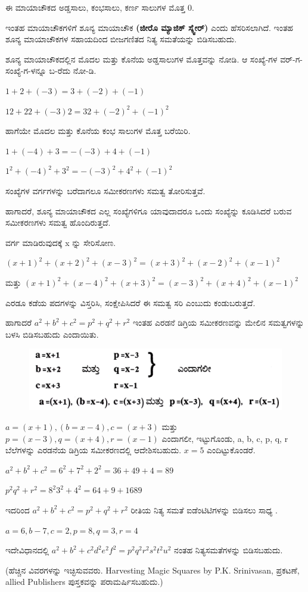 ಈ ಮಾಯಾಚೌಕದ ಅಡ್ಡಸಾಲು, ಕಂಭಸಾಲು, ಕರ್ಣ ಸಾಲುಗಳ ಮೊತ್ತ 0.

ಇಂತಹ ಮಾಯಾಚೌಕಗಳಿಗೆ ಶೂನ್ಯ ಮಾಯಾಚೌಕ \textbf{(ಜೀರೊ ಮ್ಯಾಜಿಕ್ ಸ್ಕ್ವೇರ್)} ಎಂದು ಹೆಸರಿಸಲಾಗಿದೆ. ಇಂತಹ ಶೂನ್ಯ ಮಾಯಾಚೌಕಗಳ ಸಹಾಯದಿಂದ ಬೀಜಗಣಿತದ ನಿತ್ಯ ಸಮತೆಯನ್ನು ಬಿಡಿಸಬಹುದು.

ಶೂನ್ಯ ಮಾಯಾಚೌಕದಲ್ಲಿನ ಮೊದಲ ಮತ್ತು ಕೊನೆಯ ಅಡ್ಡಸಾಲುಗಳ ಮೊತ್ತವನ್ನು ನೋಡಿ. ಆ ಸಂಖ್ಯೆ-ಗಳ ವರ್-ಗ-ಸಂಖ್ಯೆ-ಗ-ಳನ್ನೂ ಬ-ರೆದು ನೋ-ಡಿ.

$1+2+(-3) =3+(-2)+(-1)$

$12+22+(-3) 2 =32+(-2)^2 +(-1)^2$

ಹಾಗೆಯೇ ಮೊದಲ ಮತ್ತು ಕೊನೆಯ ಕಂಭ ಸಾಲುಗಳ ಮೊತ್ತ ಬರೆಯಿರಿ.

$1+(-4)+3 = -(-3)+4+(-1)$

$1^2+(-4)^2 +3^2 =-(-3)^2+4^2 +(-1)^2$

ಸಂಖ್ಯೆಗಳ ವರ್ಗಗಳನ್ನು ಬರೆದಾಗಲೂ ಸಮೀಕರಣಗಳು ಸಮತ್ವ ತೋರಿಸುತ್ತವೆ.

ಹಾಗಾದರೆ, ಶೂನ್ಯ ಮಾಯಾಚೌಕದ ಎಲ್ಲ ಸಂಖ್ಯೆಗಳಿಗೂ ಯಾವುದಾದರೂ ಒಂದು ಸಂಖ್ಯೆನ್ನು ಕೂಡಿಸಿದರೆ ಬರುವ ಸಮೀಕರಣಗಳು ಸಮತ್ವ ಹೊಂದಿರುತ್ತದೆ.

ವರ್ಗ ಮಾಡಿರುವುದಕ್ಕೆ x ನ್ನು ಸೇರಿಸೋಣ.

$(x+1)^2+(x+2)^2+(x-3)^2 = (x+3)^2+(x-2)^2+(x-1)^2$

ಮತ್ತು $(x+1)^2+(x-4)^2+(x+3)^2 = (x-3)^2+(x+4)^2+(x-1)^2$

ಎರಡೂ ಕಡೆಯ ಪದಗಳನ್ನು ವಿಸ್ತರಿಸಿ, ಸಂಕ್ಷೇಪಿಸಿದರೆ ಈ ಸಮತ್ವ ಸರಿ ಎಂಬುದು ಕಂಡುಬರುತ್ತದೆ.

ಹಾಗಾದರೆ $a^2+b^2+c^2 = p^2+q^2+r^2$ ಇಂತಹ ಎರಡನೆ ಡಿಗ್ರಿಯ ಸಮೀಕರಣವನ್ನು ಮೇಲಿನ ಸಮತ್ವಗಳನ್ನು ಬಳಸಿ ಬಿಡಿಸಬಹುದು ಎಂದಾಯಿತು.
\begin{figure}[H]
\includegraphics{src/figures/chap10/fig10.3.jpg}
\end{figure}

$a=(x+1), (b=x-4), c=(x+3)$ ಮತ್ತು $p=(x-3), q=(x+4), r=(x-1)$ ಎಂದಾಗಲೀ, ಇಟ್ಟುಗೊಂಡು, a, b, c, p, q, r ಬೆಲೆಗಳನ್ನು ಎರಡನೆಯ ಡಿಗ್ರಿಯ ಸಮೀಕರಣದಲ್ಲಿ ಆದೇಶಿಸಬಹುದು. $x=5$ ಎಂದಿಟ್ಟುಕೊಂಡರೆ.

$a^2 +b^2+c^2= 6^2 + 7^2 + 2^2 = 36 +49 +4=89$

$p^2 q^2 + r^2 = 8^2 3^2 +4^2 = 64 +9 + 16 89$

ಇದರಿಂದ $a^2+b^2+c^2 = p^2+q^2+r^2$ ರೀತಿಯ ನಿತ್ಯ ಸಮತೆ ಐಡೆಂಟಿಟಿಗಳನ್ನು ಬಿಡಿಸಲು ಸಾಧ್ಯ .

$a=6, b-7, c=2, p=8, q=3, r=4$

ಇದೇವಿಧಾನದಲ್ಲಿ $a^2 +b^2 +c^2 d^2 e^2 f^2 = p^2 q^2 r^2 s^2 t^2 u^2$ ನಂತಹ ನಿತ್ಯಸಮತೆಗಳನ್ನು ಬಿಡಿಸಬಹುದು.

(ಹೆಚ್ಚಿನ ವಿವರಗಳನ್ನು ಇಚ್ಛಿಸುವವರು. Harvesting Magic Squares by P.K. Srinivasan, ಪ್ರಕಟಣೆ, allied Publishers ಪುಸ್ತಕವನ್ನು ಪರಾಮರ್ಷಿಸಬಹುದು.)
